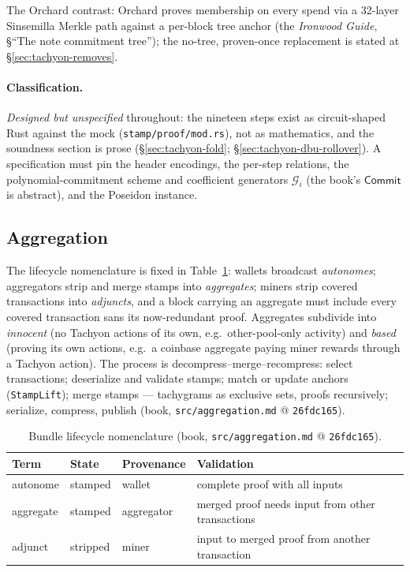 \documentclass[11pt,a4paper]{article}
\theoremstyle{definition}
\newcommand{\Comm}{\mathsf{Commit}}
\begin{document}
The Orchard contrast: Orchard proves membership on every spend via a
32-layer Sinsemilla Merkle path against a per-block tree anchor (the
\emph{Ironwood Guide}, \S``The note commitment tree''); the
no-tree, proven-once replacement is stated at
\S\ref{sec:tachyon-removes}.

\paragraph{Classification.} \emph{Designed but unspecified} throughout:
the nineteen steps exist as circuit-shaped Rust against the mock
(\texttt{stamp/proof/mod.rs}), not as mathematics, and the soundness
section is prose (\S\ref{sec:tachyon-fold};
\S\ref{sec:tachyon-dbu-rollover}). A specification must pin the header
encodings, the per-step relations, the polynomial-commitment scheme and
coefficient generators $\mathcal{G}_i$ (the book's $\Comm$ is abstract),
and the Poseidon instance.

\FloatBarrier

\subsection{Aggregation}\label{sec:tachyon-design-agg}

The lifecycle nomenclature is fixed in
Table~\ref{tab:tachyon-design-agg}: wallets broadcast \emph{autonomes};
aggregators strip and merge stamps into \emph{aggregates}; miners strip
covered transactions into \emph{adjuncts}, and a block carrying an
aggregate must include every covered transaction sans its now-redundant
proof. Aggregates subdivide into \emph{innocent} (no Tachyon actions of
its own, e.g.\ other-pool-only activity) and \emph{based} (proving its own
actions, e.g.\ a coinbase aggregate paying miner rewards through a Tachyon
action). The process is decompress--merge--recompress: select
transactions; deserialize and validate stamps; match or update anchors
(\texttt{StampLift}); merge stamps --- tachygrams as exclusive sets,
proofs recursively; serialize, compress, publish (book,
\texttt{src/aggregation.md} @ \texttt{26fdc165}).

\begin{table}[htbp]
\centering
\small
\begin{tabular}{@{}llll@{}}
\toprule
Term & State & Provenance & Validation \\
\midrule
autonome  & stamped  & wallet     & complete proof with all inputs \\
aggregate & stamped  & aggregator & merged proof needs input from other
  transactions \\
adjunct   & stripped & miner      & input to merged proof from another
  transaction \\
\bottomrule
\end{tabular}
\caption{Bundle lifecycle nomenclature (book, \texttt{src/aggregation.md}
@ \texttt{26fdc165}).}
\label{tab:tachyon-design-agg}
\end{table}
\end{document}
